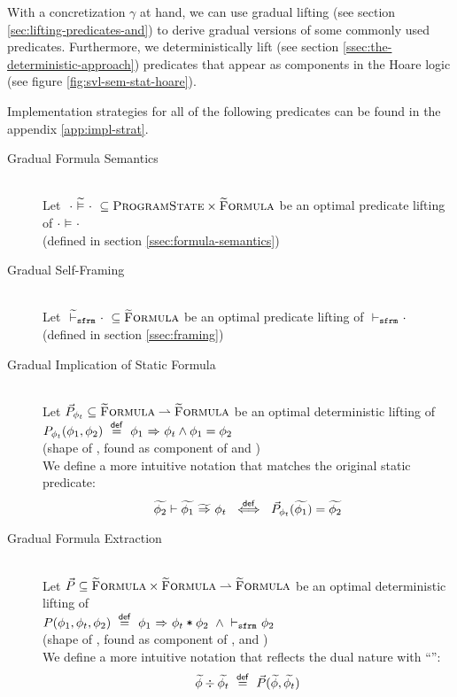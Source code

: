 With a concretization $\gamma$ at hand, we can use gradual lifting (see section \ref{sec:lifting-predicates-and}) to derive gradual versions of some commonly used predicates.
Furthermore, we deterministically lift (see section \ref{ssec:the-deterministic-approach}) predicates that appear as components in the Hoare logic (see figure \ref{fig:svl-sem-stat-hoare}).

Implementation strategies for all of the following predicates can be found in the appendix \ref{app:impl-strat}.

\begin{description}
    \item[Gradual Formula Semantics]~\\
    Let $~\evalgphiGen{\cdot}{\cdot}~ \subseteq \setProgramState \times \setGFormula$ be an optimal predicate lifting of $\evalphiGen{\cdot}{\cdot}$ 
    \\(defined in section \ref{ssec:formula-semantics})
    
    \item[Gradual Self-Framing]~\\
    Let $~\sfrmgphi \cdot~ \subseteq \setGFormula$ be an optimal predicate lifting of $\sfrmphi \cdot$ 
    \\(defined in section \ref{ssec:framing})
    
    \item[Gradual Implication of Static Formula]~\\
    Let $\dgrad{P}_{\phi_t} \subseteq \setGFormula \rightharpoonup \setGFormula$ be an optimal deterministic lifting of 
    \\$P_{\phi_t}(\phi_1, \phi_2) ~\defeq~ \phiImplies{\phi_1}{\phi_t} \wedge \phi_1 = \phi_2$ 
    \\(shape of , found as component of  and )
    \\We define a more intuitive notation that matches the original static predicate:
    \begin{displaymath}
    \gphiImpliesEv{\grad{\phi_1}}{\phi_t}{\grad{\phi_2}} ~\defiff~ \dgrad{P}_{\phi_t}(\grad{\phi_1}) = \grad{\phi_2}
    \end{displaymath}
    
    \item[Gradual Formula Extraction]~\\
    Let $\dgrad{P} \subseteq \setGFormula \times \setGFormula \rightharpoonup \setGFormula$ be an optimal deterministic lifting of 
    \\$P(\phi_1, \phi_t, \phi_2) ~\defeq~ \phiImplies{\phi_1}{\phiCons{$\phi_t$}{$\phi_2$}} ~\wedge \sfrmphi \phi_2$ 
    \\(shape of , found as component of ,  and )
    \\We define a more intuitive notation that reflects the dual nature with “\ttt{*}”:
    \begin{displaymath}
    \wo{\grad{\phi}}{\grad{\phi_t}} ~\defeq~ \dgrad{P}(\grad{\phi}, \grad{\phi_t})
    \end{displaymath}
    

\end{description}
